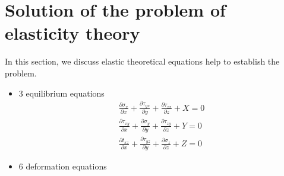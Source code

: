 \section{Solution of the problem of elasticity theory \parencite{ref5} }\label{theory}
In this section, we discuss elastic theoretical equations help to establish the problem.

\begin{itemize}
\item 3 equilibrium equations
    \begin{equation}
        \begin{split}
        \frac{{\partial {\sigma _x}}}{{\partial x}} + \frac{{\partial {\tau _{yx}}}}{{\partial y}} + \frac{{\partial {\tau _{zx}}}}{{\partial z}} + X = 0\\
        \frac{{\partial {\tau _{xy}}}}{{\partial x}} + \frac{{\partial {\sigma _y}}}{{\partial y}} + \frac{{\partial {\tau _{zy}}}}{{\partial z}} + Y = 0\\
        \frac{{\partial {t_{xz}}}}{{\partial x}} + \frac{{\partial {\tau _{yz}}}}{{\partial y}} + \frac{{\partial {\sigma _z}}}{{\partial z}} + Z = 0
        \end{split}
    \end{equation}
\item 6 deformation equations
\end{itemize}
